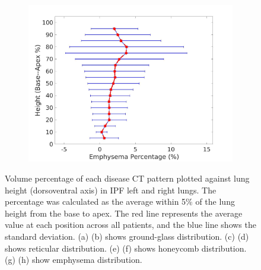\begin{figure}[H]
\begin{subfigure}{.4\linewidth}
  \includegraphics[width=\linewidth,trim={{.0\wd0} {.0\wd0} {.0\wd0} {.0\wd0}},clip]{QuantitativeAnalysis/Image/RightLungEmphysemaDiseaseAgainstHeight.jpg}
  \caption{}
  \label{fig:DiseaseAgainstHeight-h}
\end{subfigure}
\caption{Volume percentage of each disease CT pattern plotted against lung height (dorsoventral axis) in IPF left and right lungs. The percentage was calculated as the average within 5\% of the lung height from the base to apex. The red line represents the average value at each position across all patients, and the blue line shows the standard deviation. (a) (b) shows ground-glass distribution. (c) (d) shows reticular distribution. (e) (f) shows honeycomb distribution. (g) (h) show emphysema distribution.}
\label{fig:DiseaseAgainstHeight}
\end{figure}

